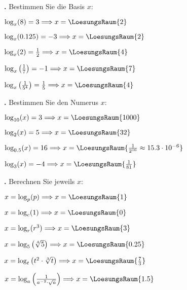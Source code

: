 \newpage

\textbf{\bbwAufgabenNummer{}.}
Bestimmen Sie die Basis $x$:

\begin{bbwAufgabenBlock}
\item $\log_x(8) = 3 \Longrightarrow x =    \LoesungsRaum{2}$
\item $\log_x(0.125) = -3 \Longrightarrow x =    \LoesungsRaum{2}$
\item $\log_x(2) = \frac12 \Longrightarrow x =    \LoesungsRaum{4}$
\item $\log_x\left(\frac17\right) = -1 \Longrightarrow x =    \LoesungsRaum{7}$
\item $\log_x\left(\frac1{5^4}\right) = \frac15 \Longrightarrow x =    \LoesungsRaum{4}$

\end{bbwAufgabenBlock}


\newpage

\textbf{\bbwAufgabenNummer{}.}
Bestimmen Sie den Numerus $x$:

\begin{bbwAufgabenBlock}
\item $\log_{10}(x) = 3 \Longrightarrow x =    \LoesungsRaum{1000}$
\item $\log_{2}(x) = 5 \Longrightarrow x =    \LoesungsRaum{32}$
\item $\log_{0.5}(x) = 16 \Longrightarrow x =    \LoesungsRaum{\frac1{2^{16}}\approx 15.3\cdot{}10^{-6}}$
\item $\log_{3}(x) = -4 \Longrightarrow x =    \LoesungsRaum{\frac1{81}}$
\end{bbwAufgabenBlock}



\newpage

\textbf{\bbwAufgabenNummer{}.}
Berechnen Sie jeweils $x$:

\begin{bbwAufgabenBlock}
\item $x=\log_p(p) \Longrightarrow x =    \LoesungsRaum{1}$
\item $x=\log_c(1) \Longrightarrow x =    \LoesungsRaum{0}$
\item $x=\log_r(r^3) \Longrightarrow x =    \LoesungsRaum{3}$
\item $x=\log_5\left(\sqrt[4]{5}\right) \Longrightarrow x =    \LoesungsRaum{0.25}$
\item $x=\log_t\left(t^2\cdot{}\sqrt[3]{t}\right) \Longrightarrow x =    \LoesungsRaum{\frac73}$
\item $x=\log_a\left( \frac1{a^{-2}\cdot{} \sqrt{a}} \right) \Longrightarrow x =    \LoesungsRaum{1.5}$
\end{bbwAufgabenBlock}


